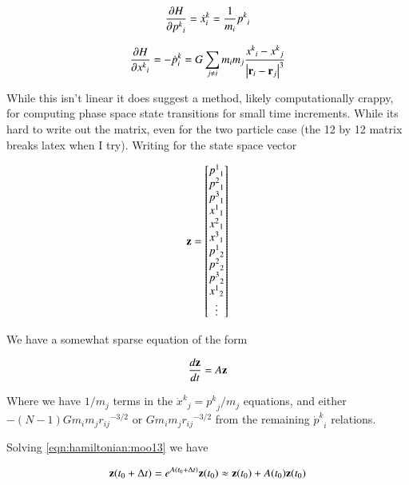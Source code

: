\begin{align}\label{eqn:hamiltonian:moo10}
\PD{{p^k}_i}{H} = {\dot{x}^k}_i = \inv{m_i} {p^k}_i 
\end{align}

\begin{align}\label{eqn:hamiltonian:moo11}
\PD{{x^k}_i}{H} = -{\dot{p}^k}_i = G \sum_{j \ne i} m_i m_j \frac{{x^k}_i -{x^k}_j}{\Abs{\Br_i - \Br_j}^3}
\end{align}

While this isn't linear it does suggest a method, likely computationally crappy, for computing phase space state transitions for small time increments.  While its hard to write out the matrix, even for the two particle case (the 12 by 12 matrix breaks latex when I try).  Writing for the state space vector


\begin{align}\label{eqn:hamiltonian:moo12}
\Bz =
\begin{bmatrix}
{p^1}_1 \\
{p^2}_1 \\
{p^3}_1 \\
{x^1}_1 \\
{x^2}_1 \\
{x^3}_1 \\
{p^1}_2 \\
{p^2}_2 \\
{p^3}_2 \\
{x^1}_2 \\
\vdots \\
\end{bmatrix}
\end{align}

We have a somewhat sparse equation of the form

\begin{align}\label{eqn:hamiltonian:moo13}
\frac{d\Bz}{dt} = A \Bz
\end{align}

Where we have $1/m_j$ terms in the ${\dot{x}^k}_j = {p^k}_j/m_j$ equations, and either $-(N-1) G m_i m_j {r_{ij}}^{-3/2}$ or $G m_i m_j {r_{ij}}^{-3/2}$ from the remaining ${\dot{p}^k}_i$ relations.

Solving \ref{eqn:hamiltonian:moo13} we have

\begin{align}\label{eqn:hamiltonian:moo14}
\Bz(t_0 + \Delta t) = e^{A (t_0 + \Delta t)} \Bz(t_0) \approx \Bz(t_0) + A(t_0) \Bz(t_0)
\end{align}

